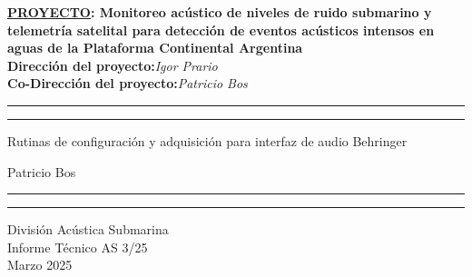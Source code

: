 \thispagestyle{empty}


	\noindent
	\begin{minipage}[c][50mm][c]{1.0\linewidth} 
		\begin{center}
			\Large{\textbf{\underline{PROYECTO}: Monitoreo acústico de niveles de ruido submarino y telemetría satelital para detección de eventos acústicos intensos en aguas de la Plataforma Continental Argentina}}\\
			\vspace{2mm}		
			\textbf{Dirección del proyecto:}\hspace{2pc}\textit{Igor Prario}\\
			\textbf{Co-Dirección del proyecto:}\hspace{2pc}\textit{Patricio Bos}\\
		\end{center}
	\end{minipage}
	\vspace{1mm}


	\noindent
	\begin{minipage}[c][70mm][c]{1.0\linewidth} 
		{\hrule\hrule}
 		\vspace{5mm}
		\begin{flushleft}
			\huge{Rutinas de configuración y adquisición para interfaz de audio Behringer}
		\end{flushleft}
		\vspace{8mm}
		\begin{flushright}
			\Large{Patricio Bos}\\
		\end{flushright}
		\vspace{2mm}
		{\hrule\hrule}
	\end{minipage}
	\vspace{-5mm}

	\noindent
	\begin{minipage}[c][30mm][c]{1.0\linewidth} 		
		\begin{flushright}
			\Large{División Acústica Submarina\\
				Informe Técnico AS 3/25\\
				Marzo 2025}\\
		\end{flushright}
	\end{minipage}
	\vspace{5mm}
	
